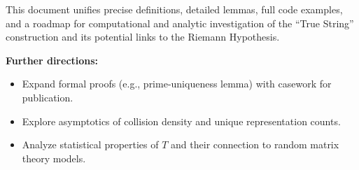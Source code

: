 \documentclass[12pt]{article}
\theoremstyle{definition}
\theoremstyle{plain}
\begin{document}
This document unifies precise definitions, detailed lemmas, full code examples, and a roadmap for computational and analytic investigation of the “True String” construction and its potential links to the Riemann Hypothesis.

\bigskip\noindent\textbf{Further directions:}
\begin{itemize}
  \item Expand formal proofs (e.g., prime-uniqueness lemma) with casework for publication.
  \item Explore asymptotics of collision density and unique representation counts.
  \item Analyze statistical properties of \(T\) and their connection to random matrix theory models.
\end{itemize}
\end{document}

